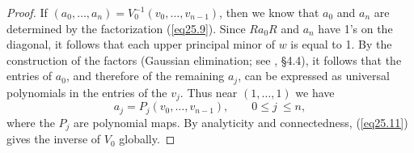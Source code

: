 \documentclass{surv-l}
\theoremstyle{plain}
\theoremstyle{definition}
\numberwithin{equation}{chapter}
\begin{document}
\begin{proof}
If $(a_{0},\ldots,a_{n})=V_{0}^{-1}(v_{0},\ldots,v_{n-1})$, then we know that $a_{0}$ and $a_{n}$ are determined by the factorization (\ref{eq25.9}). Since $Ra_{0}R$ and $a_{n}$ have 1's on the diagonal, it follows that each upper principal minor of $w$ is equal to 1. By the construction of the factors (Gaussian elimination; see \cite{Str}, \S 4.4), it follows that the entries of $a_{0}$, and therefore of the remaining $a_{j}$, can be expressed as universal polynomials in the entries of the $v_{j}$. Thus near $(1,\ldots,1)$ we have
\begin{equation}\label{eq25.11}
a_{j}=P_{j}(v_{0},\ldots, v_{n-1}), \qquad 0\leq j\ \leq n,
\end{equation}
where the $P_{j}$ are polynomial maps. By analyticity and connectedness, (\ref{eq25.11}) gives the inverse of $V_{0}$ globally.        
\end{proof}
\end{document}
